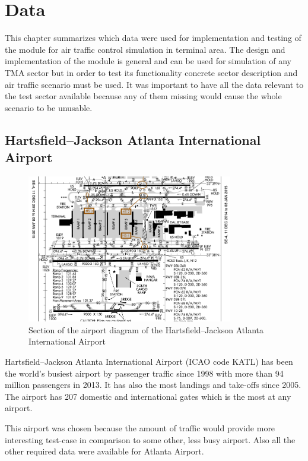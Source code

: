 \chapter{Data}

This chapter summarizes which data were used for implementation and testing of the module for air traffic control simulation in terminal area. The design and implementation of the module is general and can be used for simulation of any TMA sector but in order to test its functionality concrete sector description and air traffic scenario must be used. It was important to have all the data relevant to the test sector available because any of them missing would cause the whole scenario to be unusable.

\section{Hartsfield–Jackson Atlanta International Airport}

\begin{figure}[h]
    \centering
    \includegraphics[width=0.8\textwidth]{figures/atlanta-diagram.pdf}
    \caption{Section of the airport diagram of the Hartsfield–Jackson Atlanta International Airport \cite{atlanta-diagram}}
    \label{fig:atlanta-diagram}
\end{figure}

Hartsfield–Jackson Atlanta International Airport (ICAO code KATL) has been the world's busiest airport by passenger traffic since 1998 with more than 94 million passengers in 2013. It has also the most landings and take-offs since 2005. The airport has 207 domestic and international gates which is the most at any airport. \cite{atlanta}

This airport was chosen because the amount of traffic would provide more interesting test-case in comparison to some other, less busy airport. Also all the other required data were available for Atlanta Airport.

